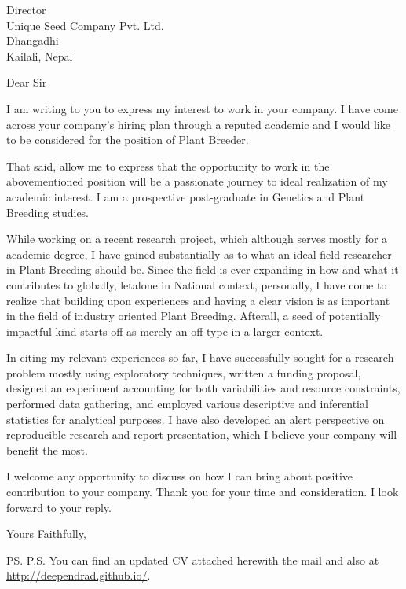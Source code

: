 \documentclass{letter}
\begin{document}
\begin{letter}{Director \\ Unique Seed Company Pvt. Ltd. \\ Dhangadhi
\\ Kailali, Nepal}
\opening{Dear Sir}

I am writing to you to express my interest to work in your company. I have come across your company's hiring plan through a reputed academic and I would like to be considered for the position of Plant Breeder.


That said, allow me to express that the opportunity to work in the abovementioned position will be a passionate journey to ideal realization of my academic interest. I am a prospective post-graduate in Genetics and Plant Breeding studies. 

While working on a recent research project, which although serves mostly for a academic degree, I have gained substantially as to what an ideal field researcher in Plant Breeding should be. Since the field is ever-expanding in how and what it contributes to globally, letalone in National context, personally, I have come to realize that building upon experiences and having a clear vision is as important in the field of industry oriented Plant Breeding. Afterall, a seed of potentially impactful kind starts off as merely an off-type in a larger context. 

In citing my relevant experiences so far, I have successfully sought for a research problem mostly using exploratory techniques, written a funding proposal, designed an experiment accounting for both variabilities and resource constraints, performed data gathering, and employed various descriptive and inferential statistics for analytical purposes. I have also developed an alert perspective on reproducible research and report presentation, which I believe your company will benefit the most.

I welcome any opportunity to discuss on how I can bring about positive contribution to your company. Thank you for your time and consideration. I look forward to your reply.

\closing{Yours Faithfully,}

\ps
P.S. You can find an updated CV attached herewith the mail and also at\\
\url{http://deependrad.github.io/}.

\end{letter}
\end{document}
